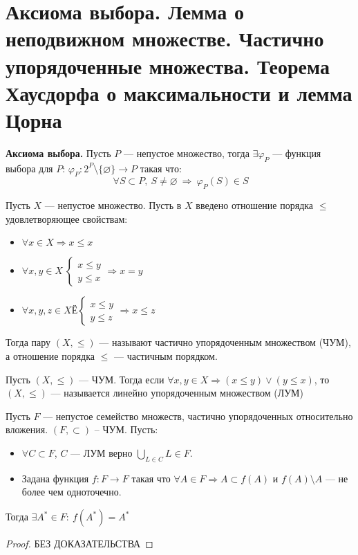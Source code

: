 \section{Аксиома выбора. Лемма о неподвижном множестве. Частично упорядоченные множества. Теорема Хаусдорфа о максимальности и лемма Цорна}

\textbf{Аксиома выбора.} Пусть $P$ --- непустое множество, тогда $\exists \varphi_P$ --- функция выбора для $P$:  $\varphi_P: 2^P\setminus \{\varnothing\} \rightarrow P$ такая что:
$$
~ \forall S \subset P, \ S \neq \varnothing ~\Rightarrow~ \varphi_P(S) \in S
$$
\begin{definition}
	\label{def:pos}
	Пусть $X$ --- непустое множество. Пусть в $X$ введено отношение порядка $\leq$ удовлетворяющее свойствам:	
	\begin{itemize}
		\item $\forall x \in X \Rightarrow x \leq x$
		\item $\forall x, y \in X ~\begin{cases}
			x \leq y \\
			y \leq x 
		\end{cases} \Rightarrow x = y $
		\item $\forall x,y,z \in X  Ё\begin{cases}
			x \leq y \\
			y \leq z 
		\end{cases} \Rightarrow x \leq z$
	\end{itemize}	
Тогда пару $(X, \leq)$ --- называют частично упорядоченным множеством (ЧУМ), а отношение порядка $\leq$ --- частичным порядком.
\end{definition}
\begin{definition}
	Пусть $(X,\leq)$ --- ЧУМ. Тогда если $\forall x,y \in X \Rightarrow (x \leq y) \vee (y \leq x)$, то $(X, \leq)$ --- называется линейно упорядоченным множеством (ЛУМ)
\end{definition}
\begin{lemma}
	Пусть $F$ --- непустое семейство множеств, частично упорядоченных относительно вложения. $(F, \subset )$ -- ЧУМ. Пусть:
	\begin{itemize}
		\item $\forall C \subset F$, $C$ --- ЛУМ верно $\bigcup\limits_{L \in C} L \in F$. 
		\item Задана функция $f: F \rightarrow F$ такая что $\forall A \in F \Rightarrow A \subset f(A)$ и $f(A) \setminus A$ --- не более чем одноточечно.
	\end{itemize}
Тогда $\exists A^*\in F:\ f(A^*) = A^*$
\end{lemma}
\begin{proof}
	БЕЗ ДОКАЗАТЕЛЬСТВА
\end{proof}

